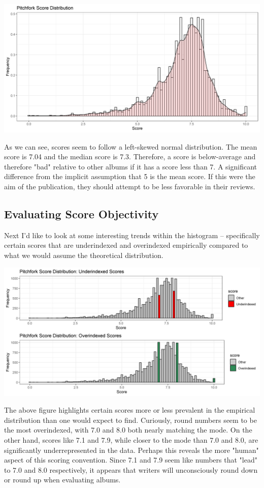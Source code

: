 \documentclass[a4paper,12pt]{article}
\begin{document}
\includegraphics[width = 0.95\linewidth]{"figures/score_distribution.png"}

As we can see, scores seem to follow a left-skewed normal distribution. The mean score is 7.04 and the median score is 7.3. Therefore, a score is below-average and therefore "bad" relative to other albums if it has a score less than 7. A significant difference from the implicit assumption that 5 is the mean score. If this were the aim of the publication, they should attempt to be less favorable in their reviews. 
\subsection{Evaluating Score Objectivity}
Next I'd like to look at some interesting trends within the histogram -- specifically certain scores that are underindexed and overindexed empirically compared to what we would assume the theoretical distribution. 

\includegraphics[width = \linewidth]{"figures/underoverindexing.png"}

The above figure highlights certain scores more or less prevalent in the empirical distribution than one would expect to find. Curiously, round numbers seem to be the most overindexed, with 7.0 and 8.0 both nearly matching the mode. On the other hand, scores like 7.1 and 7.9, while closer to the mode than 7.0 and 8.0, are significantly underrepresented in the data. Perhaps this reveals the more "human" aspect of this scoring convention. Since 7.1 and 7.9 seem like numbers that "lead" to 7.0 and 8.0 respectively, it appears that writers will unconsciously round down or round up when evaluating albums. 
\end{document}
